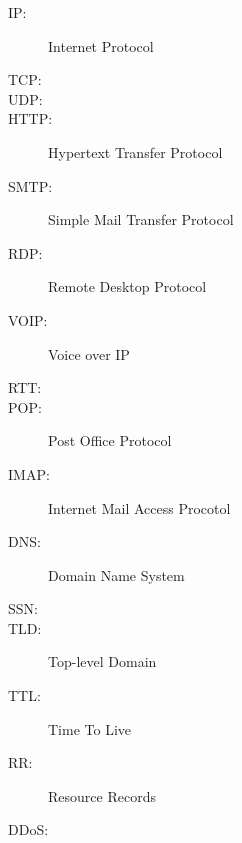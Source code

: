 
\begin{description}
	\item[IP:] Internet Protocol
	\item[TCP:] 
	\item[UDP:] 
	\item[HTTP:] Hypertext Transfer Protocol
	\item[SMTP:] Simple Mail Transfer Protocol
	\item[RDP:]	Remote Desktop Protocol
	\item[VOIP:] Voice over IP
	\item[RTT:]
	\item[POP:] Post Office Protocol
	\item[IMAP:] Internet Mail Access Procotol
	\item[DNS:] Domain Name System
	\item[SSN:]
	\item[TLD:] Top-level Domain
	\item[TTL:] Time To Live
	\item[RR:] Resource Records
	\item[DDoS:]
\end{description}